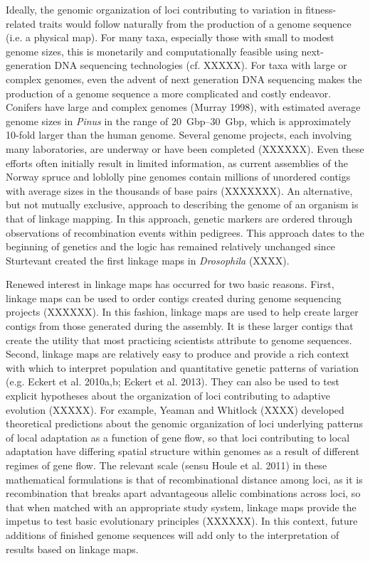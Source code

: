 \documentclass[11pt]{article}
\begin{document}
Ideally, the genomic organization of loci contributing to variation in fitness-related traits would 
follow naturally from the production of a genome sequence (i.e. a physical map). For many taxa, especially those 
with small to modest genome sizes,
this is monetarily and computationally feasible using next-generation DNA sequencing technologies (cf. XXXXX). For taxa with large or complex
genomes, even the advent of next generation DNA sequencing makes the production of a genome sequence 
a more complicated and costly endeavor. Conifers have large and complex genomes (Murray 1998), with estimated average genome sizes 
in \textit{Pinus} in the range of \SIrange{20}{30}{Gbp},
which is approximately 10-fold larger than the human genome. 
Several genome projects, each involving many laboratories, are
underway or have been completed (XXXXXX). Even these efforts often initially 
result in limited information, as current assemblies of the Norway spruce and
loblolly pine genomes contain millions of unordered contigs with average sizes in the thousands of base pairs (XXXXXXX). An alternative, 
but not mutually exclusive, approach to describing the genome of an
organism is that of linkage mapping. In this approach, genetic markers are ordered through 
observations of recombination events within pedigrees. This approach
dates to the beginning of genetics and the logic has remained relatively unchanged since 
Sturtevant created the first linkage maps in \textit{Drosophila} (XXXX).

Renewed interest in linkage maps has occurred for two basic reasons. First, linkage maps can be used 
to order contigs created during genome sequencing projects (XXXXXX). In this fashion, linkage maps are
used to help create larger contigs from those generated during the assembly. It is these larger contigs that
create the utility that most practicing scientists attribute to genome sequences. Second, linkage maps are 
relatively easy to produce and provide a rich context with which to interpret
population and quantitative genetic patterns of variation (e.g. Eckert et al. 2010a,b; Eckert et al. 2013). 
They can also be used to test explicit hypotheses about the organization of loci contributing to 
adaptive evolution (XXXXX). For example, Yeaman and Whitlock (XXXX) developed theoretical predictions
about the genomic organization of loci underlying patterns of local adaptation as a function of gene 
flow, so that loci contributing to local adaptation have differing spatial structure within genomes
as a result of different regimes of gene flow. The relevant scale (sensu Houle et al. 2011) in these mathematical formulations 
is that of recombinational distance among loci,
as it is recombination that breaks apart advantageous allelic combinations across loci, so that when 
matched with an appropriate study system, linkage maps provide the impetus to test basic 
evolutionary principles (XXXXXX). In this context, future additions of finished genome sequences will add only to the interpretation of results
based on linkage maps.
\end{document}
